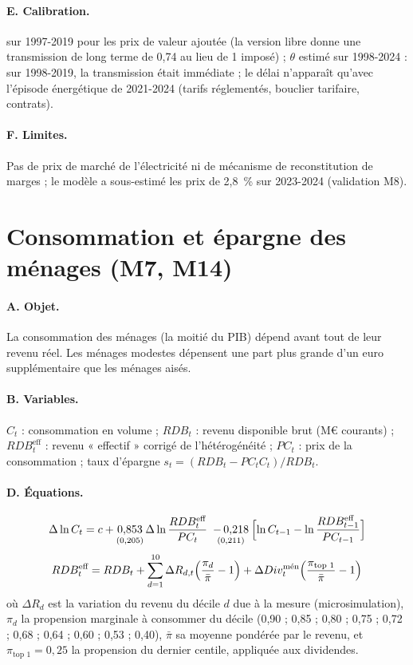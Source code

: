 \paragraph{E. Calibration.}  sur 1997-2019 pour les prix de valeur ajoutée (la version libre donne une
transmission de long terme de 0,74 au lieu de 1 imposé) ; $\theta$ estimé sur 1998-2024 : sur 1998-2019, la
transmission était immédiate ; le délai n'apparaît qu'avec l'épisode énergétique de 2021-2024 (tarifs réglementés,
bouclier tarifaire, contrats).

\paragraph{F. Limites.} Pas de prix de marché de l'électricité ni de mécanisme de reconstitution de marges ; le
modèle a sous-estimé les prix de 2,8~\% sur 2023-2024 (validation M8).

\section{Consommation et épargne des ménages (M7, M14)}
\label{sec:conso}

\paragraph{A. Objet.} La consommation des ménages (la moitié du PIB) dépend avant tout de leur revenu réel. Les
ménages modestes dépensent une part plus grande d'un euro supplémentaire que les ménages aisés.

\paragraph{B. Variables.} $C_t$ : consommation en volume ; $RDB_t$ : revenu disponible brut (M€ courants) ;
$RDB^{\text{eff}}_t$ : revenu « effectif » corrigé de l'hétérogénéité ; $PC_t$ : prix de la consommation ; taux
d'épargne $s_t = (RDB_t - PC_t C_t)/RDB_t$.

\paragraph{D. Équations.}
\begin{equation}
\Delta\ln C_t = c + \underset{(0{,}205)}{0{,}853}\,\Delta\ln\frac{RDB^{\text{eff}}_t}{PC_t} \;\underset{(0{,}211)}{-\,0{,}218}\Bigl[\ln C_{t-1} - \ln\frac{RDB^{\text{eff}}_{t-1}}{PC_{t-1}}\Bigr]
\end{equation}
\begin{equation}
RDB^{\text{eff}}_t = RDB_t + \sum_{d=1}^{10} \Delta R_{d,t}\Bigl(\frac{\pi_d}{\bar\pi}-1\Bigr) + \Delta Div^{\text{mén}}_t\Bigl(\frac{\pi_{\text{top 1}}}{\bar\pi}-1\Bigr)
\end{equation}
où $\Delta R_d$ est la variation du revenu du décile $d$ due à la mesure (microsimulation), $\pi_d$ la propension
marginale à consommer du décile (0,90 ; 0,85 ; 0,80 ; 0,75 ; 0,72 ; 0,68 ; 0,64 ; 0,60 ; 0,53 ; 0,40), $\bar\pi$ sa moyenne
pondérée par le revenu, et $\pi_{\text{top 1}} = 0{,}25$ la propension du dernier centile, appliquée aux dividendes.

